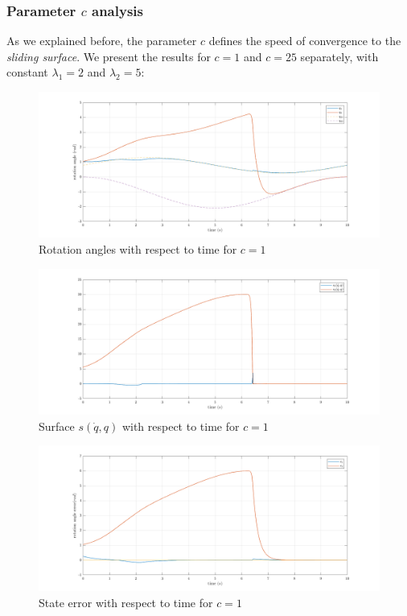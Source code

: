 \documentclass[a4paper]{article}
\begin{document}
\newpage
\subsubsection{Parameter $c$ analysis}
As we explained before, the parameter $c$ defines the speed of convergence to the \textit{sliding surface}.
We present the results for $c=1$ and $c=25$ separately, with constant $\lambda_1 = 2$ and $\lambda_2 = 5$:
\begin{figure}[H]
    \centering
    \includegraphics[width=15cm]{fig/sim2/c1/q1.png}
    \caption{Rotation angles with respect to time for $c=1$}
\end{figure}
\begin{figure}[H]
    \centering
    \includegraphics[width=15cm]{fig/sim2/c1/s1.png}
    \caption{Surface $s(\dot{q}, q)$ with respect to time for $c=1$}
\end{figure}
\begin{figure}[H]
    \centering
    \includegraphics[width=15cm]{fig/sim2/c1/e1.png}
    \caption{State error with respect to time for $c=1$}
\end{figure}
\end{document}
